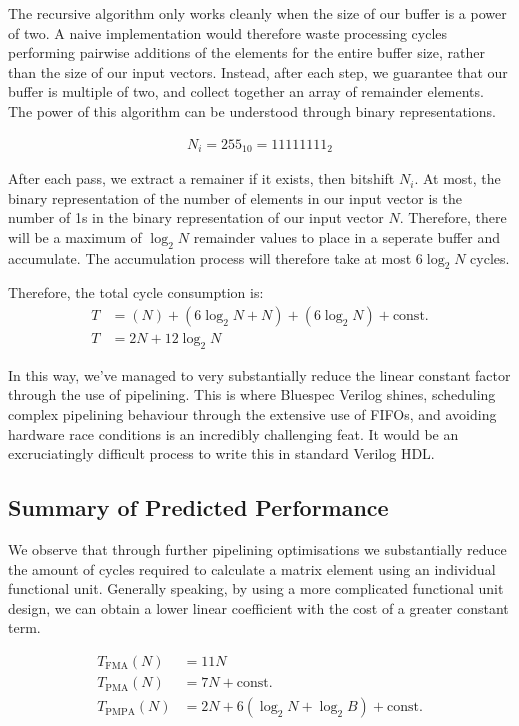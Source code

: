 \documentclass[a4paper,8pt]{report}
\begin{document}
The recursive algorithm only works cleanly when the size of our buffer is a
power of two. A naive implementation would therefore waste processing cycles
performing pairwise additions of the elements for the entire buffer size, rather
than the size of our input vectors. Instead, after each step, we guarantee that
our buffer is multiple of two, and collect together an array of remainder
elements. The power of this algorithm can be understood through binary
representations.

\begin{align*}
  N_i = 255_{10} = 11111111_{2}
\end{align*}

After each pass, we extract a remainer if it exists, then bitshift $N_i$. At
most, the binary representation of the number of elements in our input vector is
the number of 1s in the binary representation of our input vector $N$. Therefore, there will
be a maximum of $\log_{2}{N}$ remainder values to place in a seperate buffer and
accumulate. The accumulation process will therefore take at most $6\log_{2}{N}$ cycles.

Therefore, the total cycle consumption is:
\begin{align*}
  T &= (N) + (6\log_2{N} + N) + (6\log_2{N}) + \text{const.} \\
  T &= 2N + 12\log_2{N}
\end{align*}

In this way, we've managed to very substantially reduce the linear constant
factor through the use of pipelining. This is where Bluespec Verilog shines,
scheduling complex pipelining behaviour through the extensive use of FIFOs, and
avoiding hardware race conditions is an incredibly challenging feat. It would be
an excruciatingly difficult process to write this in standard Verilog HDL. 

\subsection{Summary of Predicted Performance}
We observe that through further pipelining optimisations we substantially reduce
the amount of cycles required to calculate a matrix element using an individual
functional unit. Generally speaking, by using a more complicated functional unit
design, we can obtain a lower linear coefficient with the cost of a greater
constant term.

\begin{align*}
  T_{\text{FMA}}(N) &= 11N \\
  T_{\text{PMA}}(N) &= 7N + \text{const.}  \\
  T_{\text{PMPA}}(N) &= 2N + 6(\log_2{N} + \log_2{B}) + \text{const.}
\end{align*}
\end{document}
